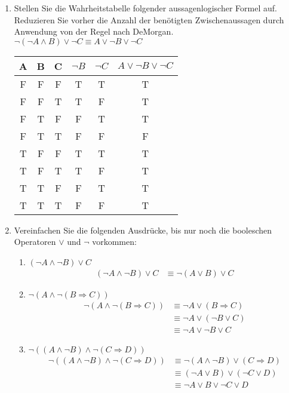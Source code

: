 \documentclass[a4paper,onecolumn,pdftex]{report}
\begin{document}
\begin{enumerate}
        \vspace{50px}
        \item Stellen Sie die Wahrheitstabelle folgender aussagenlogischer Formel auf. Reduzieren Sie vorher die Anzahl der benötigten Zwischenaussagen durch Anwendung von der Regel nach DeMorgan.  \\
        $\neg (\neg A \wedge B) \lor \neg C \equiv A \lor \neg B \lor \neg C$ \\
        \begin{tabular}{|c|c|c|c|c|c|} \hline
            A&B&C&$\neg B$&$\neg C$&$A \lor \neg B \lor \neg C$ \\ \hline
            F&F&F&T&T&T \\ \hline
            F&F&T&T&F&T \\ \hline
            F&T&F&F&T&T \\ \hline
            F&T&T&F&F&F \\ \hline
            T&F&F&T&T&T \\ \hline
            T&F&T&T&F&T \\ \hline
            T&T&F&F&T&T \\ \hline
            T&T&T&F&F&T \\ \hline
        \end{tabular}

        \newpage
        \item Vereinfachen Sie die folgenden Ausdrücke, bis nur noch die booleschen Operatoren $\lor$ und $\neg$ vorkommen:
        \begin{enumerate}
            \item $(\neg A \wedge \neg B) \lor C$
            \begin{align*}
                (\neg A \wedge \neg B) \lor C &\equiv \neg (A \lor B) \lor C
            \end{align*}

            \item $\neg (A \wedge \neg (B \Rightarrow C))$
            \begin{align*}
                \neg (A \wedge \neg (B \Rightarrow C)) &\equiv \neg A \lor (B \Rightarrow C) \\
                &\equiv \neg A \lor (\neg B \lor C) \\
                &\equiv \neg A \lor \neg B \lor C
            \end{align*}

            \item $\neg ((A \wedge \neg B) \wedge \neg (C \Rightarrow D))$
            \begin{align*}
                \neg ((A \wedge \neg B) \wedge \neg (C \Rightarrow D)) &\equiv \neg (A \wedge \neg B) \lor (C \Rightarrow D) \\
                &\equiv (\neg A \lor B) \lor (\neg C \lor D) \\
                &\equiv \neg A \lor B \lor \neg C \lor D
            \end{align*}
        \end{enumerate}
    

\end{enumerate}
\end{document}
